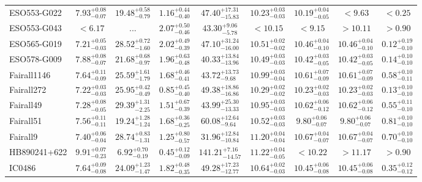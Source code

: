 \documentclass[onecolumn]{mn2e}
\begin{document}
{\begin{center}
\begin{longtable}{lcccccccc}
ESO553-G022 & $7.93_{-0.07}^{+0.08}$ & $19.48_{-0.79}^{+0.58}$ & $1.16_{-0.40}^{+0.44}$ &$47.40_{-15.83}^{+17.31}$ & $10.23_{-0.03}^{+0.03}$ & $10.19_{-0.05}^{+0.04}$ & $<9.63$ & $<0.25$ \\
ESO553-G043 & $<6.17$ & ... & $2.07_{-0.46}^{+0.50}$ &$43.30_{-5.78}^{+9.06}$ & $<10.15$ & $<9.15$ & $>10.11$ & $>0.90$ \\
ESO565-G019 & $7.21_{-0.03}^{+0.05}$ & $28.52_{-1.60}^{+0.72}$ & $2.02_{-0.39}^{+0.49}$ &$47.10_{-16.00}^{+31.24}$ & $10.51_{-0.02}^{+0.02}$ & $10.46_{-0.10}^{+0.04}$ & $10.46_{-0.10}^{+0.04}$ & $0.12_{-0.10}^{+0.19}$ \\
ESO578-G009 & $7.88_{-0.07}^{+0.08}$ & $21.68_{-0.97}^{+0.68}$ & $1.96_{-0.48}^{+0.63}$ &$40.33_{-13.96}^{+13.84}$ & $10.49_{-0.03}^{+0.03}$ & $10.42_{-0.05}^{+0.03}$ & $10.42_{-0.05}^{+0.03}$ & $0.14_{-0.10}^{+0.10}$ \\
Fairall1146 & $7.64_{-0.09}^{+0.11}$ & $25.59_{-1.79}^{+1.61}$ & $1.68_{-0.41}^{+0.46}$ &$43.72_{-9.68}^{+13.73}$ & $10.99_{-0.04}^{+0.03}$ & $10.61_{-0.09}^{+0.07}$ & $10.61_{-0.09}^{+0.07}$ & $0.58_{-0.11}^{+0.10}$ \\
Fairall272 & $7.22_{-0.03}^{+0.03}$ & $25.95_{-0.49}^{+0.42}$ & $0.85_{-0.40}^{+0.45}$ &$49.38_{-16.86}^{+18.86}$ & $10.29_{-0.02}^{+0.02}$ & $10.23_{-0.03}^{+0.02}$ & $10.23_{-0.03}^{+0.02}$ & $0.13_{-0.10}^{+0.10}$ \\
Fairall49 & $7.28_{-0.05}^{+0.08}$ & $29.39_{-2.25}^{+1.31}$ & $1.51_{-0.39}^{+0.67}$ &$43.99_{-13.33}^{+25.30}$ & $10.95_{-0.03}^{+0.03}$ & $10.62_{-0.12}^{+0.06}$ & $10.62_{-0.12}^{+0.06}$ & $0.55_{-0.10}^{+0.11}$ \\
Fairall51 & $7.56_{-0.11}^{+0.11}$ & $19.24_{-1.24}^{+1.28}$ & $1.68_{-0.25}^{+0.36}$ &$60.08_{-9.64}^{+12.64}$ & $10.52_{-0.03}^{+0.03}$ & $9.80_{-0.07}^{+0.06}$ & $9.80_{-0.07}^{+0.06}$ & $0.81_{-0.10}^{+0.10}$ \\
Fairall9 & $7.40_{-0.04}^{+0.06}$ & $28.74_{-1.31}^{+0.83}$ & $1.25_{-0.57}^{+0.80}$ &$31.96_{-10.84}^{+12.84}$ & $11.20_{-0.04}^{+0.04}$ & $10.67_{-0.07}^{+0.04}$ & $10.67_{-0.07}^{+0.04}$ & $0.70_{-0.10}^{+0.10}$ \\
HB890241+622 & $9.91_{-0.23}^{+0.07}$ & $6.92_{-0.19}^{+0.70}$ & $0.45_{-0.09}^{+0.12}$ &$141.21_{-14.57}^{+7.16}$ & $11.22_{-0.05}^{+0.04}$ & $<10.22$ & $>11.17$ & $>0.90$ \\
IC0486 & $7.64_{-0.08}^{+0.09}$ & $24.09_{-1.47}^{+1.23}$ & $1.82_{-0.35}^{+0.48}$ &$49.28_{-12.77}^{+17.23}$ & $10.64_{-0.03}^{+0.02}$ & $10.45_{-0.08}^{+0.06}$ & $10.45_{-0.08}^{+0.06}$ & $0.35_{-0.12}^{+0.12}$ \\

\end{longtable}
\end{center}}
\end{document}
